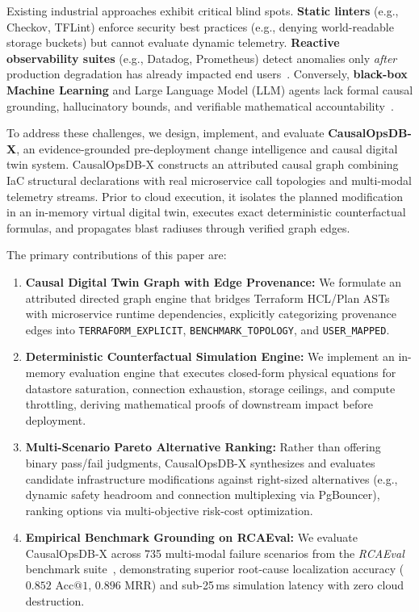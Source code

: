 \documentclass[conference]{IEEEtran}
\begin{document}
Existing industrial approaches exhibit critical blind spots. \textbf{Static linters} (e.g., Checkov, TFLint) enforce security best practices (e.g., denying world-readable storage buckets) but cannot evaluate dynamic telemetry. \textbf{Reactive observability suites} (e.g., Datadog, Prometheus) detect anomalies only \textit{after} production degradation has already impacted end users~\cite{opentelemetry2023spec}. Conversely, \textbf{black-box Machine Learning} and Large Language Model (LLM) agents lack formal causal grounding, hallucinatory bounds, and verifiable mathematical accountability~\cite{pearl2009causality}.

To address these challenges, we design, implement, and evaluate \textbf{CausalOpsDB-X}, an evidence-grounded pre-deployment change intelligence and causal digital twin system. CausalOpsDB-X constructs an attributed causal graph combining IaC structural declarations with real microservice call topologies and multi-modal telemetry streams. Prior to cloud execution, it isolates the planned modification in an in-memory virtual digital twin, executes exact deterministic counterfactual formulas, and propagates blast radiuses through verified graph edges.

The primary contributions of this paper are:
\begin{enumerate}
    \item \textbf{Causal Digital Twin Graph with Edge Provenance:} We formulate an attributed directed graph engine that bridges Terraform HCL/Plan ASTs with microservice runtime dependencies, explicitly categorizing provenance edges into \texttt{TERRAFORM\_EXPLICIT}, \texttt{BENCHMARK\_TOPOLOGY}, and \texttt{USER\_MAPPED}.
    \item \textbf{Deterministic Counterfactual Simulation Engine:} We implement an in-memory evaluation engine that executes closed-form physical equations for datastore saturation, connection exhaustion, storage ceilings, and compute throttling, deriving mathematical proofs of downstream impact before deployment.
    \item \textbf{Multi-Scenario Pareto Alternative Ranking:} Rather than offering binary pass/fail judgments, CausalOpsDB-X synthesizes and evaluates candidate infrastructure modifications against right-sized alternatives (e.g., dynamic safety headroom and connection multiplexing via PgBouncer), ranking options via multi-objective risk-cost optimization.
    \item \textbf{Empirical Benchmark Grounding on RCAEval:} We evaluate CausalOpsDB-X across 735 multi-modal failure scenarios from the \textit{RCAEval} benchmark suite~\cite{phamquiluan2024rcaeval}, demonstrating superior root-cause localization accuracy ($0.852$ $\text{Acc}@1$, $0.896$ MRR) and sub-25\,ms simulation latency with zero cloud destruction.
\end{enumerate}
\end{document}
